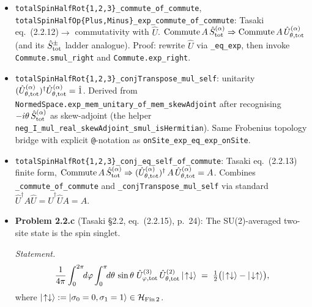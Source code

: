 \documentclass[a4paper,11pt]{article}
\begin{document}
\begin{itemize}
  \texttt{totalSpinHalfRot\{1,2,3\}\_eq\_exp}: Tasaki eq.~(2.2.11),
  $\hat U^{(\alpha)}_{\theta,{\rm tot}}
   = \exp[-i\theta \hat S^{(\alpha)}_{\rm tot}]$. The proof composes
  the per-site exp form, the bridge
  $\texttt{onSite}\,x\,(\exp A) = \exp(\texttt{onSite}\,x\,A)$
  (proved by installing the Frobenius normed structure locally and
  invoking \texttt{NormedSpace.map\_exp} via
  \texttt{LinearMap.continuous\_of\_finiteDimensional}), and
  \texttt{Matrix.exp\_sum\_of\_commute} for the commuting site
  embeddings.
\item \texttt{totalSpinHalfRot\{1,2,3\}\_commute\_of\_commute},
  \texttt{totalSpinHalfOp\{Plus,Minus\}\_exp\_commute\_of\_commute}:
  Tasaki eq.~(2.2.12)$\to$ commutativity with $\hat U$.
  $\mathrm{Commute}\,A\,\hat S^{(\alpha)}_{\rm tot}
    \Rightarrow \mathrm{Commute}\,A\,\hat U^{(\alpha)}_{\theta,{\rm tot}}$
  (and its $\hat S^{\pm}_{\rm tot}$ ladder analogue). Proof: rewrite
  $\hat U$ via \texttt{\_eq\_exp}, then invoke
  \texttt{Commute.smul\_right} and \texttt{Commute.exp\_right}.
\item \texttt{totalSpinHalfRot\{1,2,3\}\_conjTranspose\_mul\_self}:
  unitarity $(\hat U^{(\alpha)}_{\theta,{\rm tot}})^\dagger
  \hat U^{(\alpha)}_{\theta,{\rm tot}} = \hat 1$. Derived from
  \texttt{NormedSpace.exp\_mem\_unitary\_of\_mem\_skewAdjoint} after
  recognising $-i\theta\,\hat S^{(\alpha)}_{\rm tot}$ as skew-adjoint
  (the helper \texttt{neg\_I\_mul\_real\_skewAdjoint\_smul\_isHermitian}).
  Same Frobenius topology bridge with explicit \texttt{@}-notation as
  \texttt{onSite\_exp\_eq\_exp\_onSite}.
\item \texttt{totalSpinHalfRot\{1,2,3\}\_conj\_eq\_self\_of\_commute}:
  Tasaki eq.~(2.2.13) finite form,
  $\mathrm{Commute}\,A\,\hat S^{(\alpha)}_{\rm tot}
    \Rightarrow (\hat U^{(\alpha)}_{\theta,{\rm tot}})^\dagger\,A\,
    \hat U^{(\alpha)}_{\theta,{\rm tot}} = A$. Combines
  \texttt{\_commute\_of\_commute} and \texttt{\_conjTranspose\_mul\_self}
  via standard $\hat U^\dagger A \hat U = \hat U^\dagger \hat U A
  = A$.
\item \textbf{Problem 2.2.c} (Tasaki §2.2, eq.~(2.2.15), p.~24):
  The SU(2)-averaged two-site state is the spin singlet.

  \textit{Statement.}
  \[
    \frac{1}{4\pi}
    \int_0^{2\pi}\!\!d\varphi\int_0^\pi\!\!d\theta\,\sin\theta\;
    \hat U^{(3)}_{\varphi,{\rm tot}}\,\hat U^{(2)}_{\theta,{\rm tot}}\,
    |\!\uparrow\downarrow\rangle
    \;=\;
    \tfrac{1}{2}\bigl(|\!\uparrow\downarrow\rangle
                     - |\!\downarrow\uparrow\rangle\bigr),
  \]
  where $|\!\uparrow\downarrow\rangle := |\sigma_0=0,\sigma_1=1\rangle
  \in \mathcal{H}_{\rm Fin\,2}$.


\end{itemize}
\end{document}
